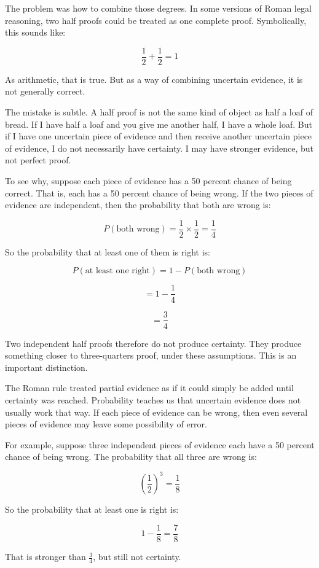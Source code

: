 \documentclass[
  letterpaper,
  DIV=11,
  numbers=noendperiod]{scrreprt}
\begin{document}
The problem was how to combine those degrees. In some versions of Roman
legal reasoning, two half proofs could be treated as one complete proof.
Symbolically, this sounds like:

\[\frac{1}{2} + \frac{1}{2} = 1\]

As arithmetic, that is true. But as a way of combining uncertain
evidence, it is not generally correct.

The mistake is subtle. A half proof is not the same kind of object as
half a loaf of bread. If I have half a loaf and you give me another
half, I have a whole loaf. But if I have one uncertain piece of evidence
and then receive another uncertain piece of evidence, I do not
necessarily have certainty. I may have stronger evidence, but not
perfect proof.

To see why, suppose each piece of evidence has a 50 percent chance of
being correct. That is, each has a 50 percent chance of being wrong. If
the two pieces of evidence are independent, then the probability that
both are wrong is:

\[P(\text{both wrong}) = \frac{1}{2} \times \frac{1}{2} = \frac{1}{4}\]

So the probability that at least one of them is right is:

\[P(\text{at least one right}) = 1 - P(\text{both wrong})\]

\[= 1 - \frac{1}{4}\]

\[= \frac{3}{4}\]

Two independent half proofs therefore do not produce certainty. They
produce something closer to three-quarters proof, under these
assumptions. This is an important distinction.

The Roman rule treated partial evidence as if it could simply be added
until certainty was reached. Probability teaches us that uncertain
evidence does not usually work that way. If each piece of evidence can
be wrong, then even several pieces of evidence may leave some
possibility of error.

For example, suppose three independent pieces of evidence each have a 50
percent chance of being wrong. The probability that all three are wrong
is:

\[\left(\frac{1}{2}\right)^3 = \frac{1}{8}\]

So the probability that at least one is right is:

\[1 - \frac{1}{8} = \frac{7}{8}\]

That is stronger than \(\frac{3}{4}\), but still not certainty.
\end{document}

